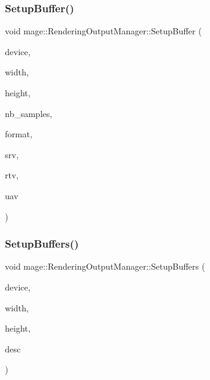 \hypertarget{classmage_1_1_rendering_output_manager_a4170300a908e46623e4eed3baf16570f}{}\label{classmage_1_1_rendering_output_manager_a4170300a908e46623e4eed3baf16570f} 
\subsubsection{\texorpdfstring{Setup\+Buffer()}{SetupBuffer()}}
{\footnotesize\ttfamily void mage\+::\+Rendering\+Output\+Manager\+::\+Setup\+Buffer (\begin{DoxyParamCaption}\item[{I\+D3\+D11\+Device5 $\ast$}]{device,  }\item[{\hyperlink{namespacemage_a41c104c036fba3756a74e19f793eeaa1}{U32}}]{width,  }\item[{\hyperlink{namespacemage_a41c104c036fba3756a74e19f793eeaa1}{U32}}]{height,  }\item[{\hyperlink{namespacemage_a41c104c036fba3756a74e19f793eeaa1}{U32}}]{nb\+\_\+samples,  }\item[{D\+X\+G\+I\+\_\+\+F\+O\+R\+M\+AT}]{format,  }\item[{I\+D3\+D11\+Shader\+Resource\+View $\ast$$\ast$}]{srv,  }\item[{I\+D3\+D11\+Render\+Target\+View $\ast$$\ast$}]{rtv,  }\item[{I\+D3\+D11\+Unordered\+Access\+View $\ast$$\ast$}]{uav }\end{DoxyParamCaption})\hspace{0.3cm}{\ttfamily [private]}}

\hypertarget{classmage_1_1_rendering_output_manager_afea7686ac1181f180c23fe65930a9eba}{}\label{classmage_1_1_rendering_output_manager_afea7686ac1181f180c23fe65930a9eba} 
\subsubsection{\texorpdfstring{Setup\+Buffers()}{SetupBuffers()}}
{\footnotesize\ttfamily void mage\+::\+Rendering\+Output\+Manager\+::\+Setup\+Buffers (\begin{DoxyParamCaption}\item[{I\+D3\+D11\+Device5 $\ast$}]{device,  }\item[{\hyperlink{namespacemage_a41c104c036fba3756a74e19f793eeaa1}{U32}}]{width,  }\item[{\hyperlink{namespacemage_a41c104c036fba3756a74e19f793eeaa1}{U32}}]{height,  }\item[{\hyperlink{namespacemage_a86cd40b8f2f42ca4d616cc6ec665a7f2}{A\+A\+Descriptor}}]{desc }\end{DoxyParamCaption})\hspace{0.3cm}{\ttfamily [private]}}

